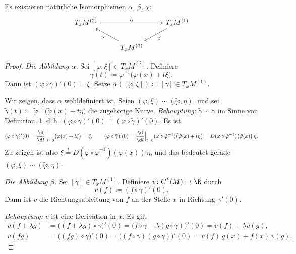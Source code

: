 \documentclass[11pt]{article}
\begin{document}
\begin{proposition}\Theorem
  Es existieren natürliche Isomorphismen $\alpha$, $\beta$, $\chi$:
  \[
    \begin{tikzcd}
      T_x M^{(2)} \arrow{rr}{\alpha} & & T_x M^{(1)} \arrow{dl}{\beta} \\
      & T_x M^{(3)} \arrow{ul}{\chi} &
    \end{tikzcd}
  \]
\end{proposition}

\begin{proof}
  \textit{Die Abbildung $\alpha$.} Sei $[\varphi, \xi] \in T_x M^{(2)}$. Definiere
  \[ \gamma(t) \coloneqq \varphi^{-1}\bigl(\varphi(x) + t\xi\bigr). \]
  Dann ist $(\varphi \circ \gamma)'(0) = \xi$. Setze $\alpha([\varphi, \xi]) \coloneqq [\gamma] \in T_x M^{(1)}$.

  Wir zeigen, dass $\alpha$ wohldefiniert ist. Seien $(\varphi, \xi) \sim (\tilde{\varphi}, \eta)$, und sei $\tilde{\gamma}(t) \coloneqq \tilde{\varphi}^{-1}\bigl(\tilde{\varphi}(x) + t\eta\bigr)$ die zugehörige Kurve.
\textit{Behauptung:} $\tilde{\gamma} \sim \gamma$ im Sinne von Definition~1, d.\,h. $(\varphi \circ \gamma)'(0) \overset{!}{=} (\varphi \circ \tilde{\gamma})'(0)$. Es ist
  \[ (\varphi \circ \gamma)'(0) = \frac{\d}{\d t}\Big|_{t=0} \bigl(\varphi(x) + t\xi\bigr) = \xi, \qquad (\varphi \circ \tilde{\gamma})'(0) = \frac{\d}{\d t}\Big|_{t=0} (\varphi \circ \tilde{\varphi}^{-1})\bigl(\tilde{\varphi}(x) + t\eta\bigr) = D(\varphi \circ \tilde{\varphi}^{-1})\bigl(\tilde{\varphi}(x)\bigr)\, \eta. \]
  Zu zeigen ist also $\xi \overset{!}{=} D(\varphi \circ \tilde{\varphi}^{-1})(\tilde{\varphi}(x))\, \eta$, und das bedeutet gerade $(\varphi, \xi) \sim (\tilde{\varphi}, \eta)$.


  \textit{Die Abbildung $\beta$.} Sei $[\gamma] \in T_x M^{(1)}$. Definiere $v\colon C^k(M) \to \R$ durch
  \[ v(f) \coloneqq (f \circ \gamma)'(0). \]
  Dann ist $v$ die \glqq Richtungsableitung\grqq{} von $f$ an der Stelle $x$ in Richtung $\gamma'(0)$.

  \textit{Behauptung:} $v$ ist eine Derivation in $x$. Es gilt
  \begin{align*}
    v(f + \lambda g) &= \bigl((f + \lambda g) \circ \gamma\bigr)'(0) = \bigl(f \circ \gamma + \lambda (g \circ \gamma)\bigr)'(0) = v(f) + \lambda v(g), \\
    v(fg) &= \bigl((fg) \circ \gamma\bigr)'(0) = \bigl((f \circ \gamma)(g \circ \gamma)\bigr)'(0) = v(f)\, g(x) + f(x)\, v(g).
  \end{align*}


\end{proof}
\end{document}
